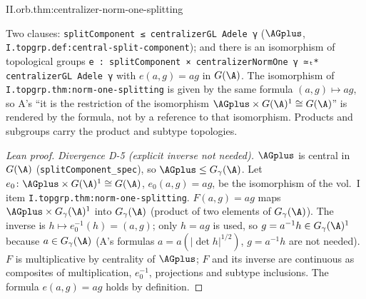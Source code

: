 \begin{theorem}
\end{theorem}
\begin{tfformal}{II.orb.thm:centralizer-norm-one-splitting}
\begin{tffidelity}
Two clauses: \texttt{splitComponent ≤ centralizerGL Adele γ} ($\AGplus$, \texttt{I.topgrp.def:central-split-component}); and there is an isomorphism of topological groups \texttt{e : splitComponent × centralizerNormOne γ ≃ₜ* centralizerGL Adele γ} with $e(a,g)=ag$ in $G(\A)$. The isomorphism of \texttt{I.topgrp.thm:norm-one-splitting} is given by the same formula $(a,g)\mapsto ag$, so A's ``it is the restriction of the isomorphism $\AGplus\times G(\A)^1\cong G(\A)$'' is rendered by the formula, not by a reference to that isomorphism. Products and subgroups carry the product and subtype topologies.
\end{tffidelity}
\end{tfformal}
\begin{proof}[Lean proof]
\emph{Divergence D-5 (explicit inverse not needed).} $\AGplus$ is central in $G(\A)$ (\texttt{splitComponent\_spec}), so $\AGplus\le G_\gamma(\A)$. Let $e_0\colon\AGplus\times G(\A)^1\cong G(\A)$, $e_0(a,g)=ag$, be the isomorphism of the vol.~I item \texttt{I.topgrp.thm:norm-one-splitting}. $F(a,g)=ag$ maps $\AGplus\times G_\gamma(\A)^1$ into $G_\gamma(\A)$ (product of two elements of $G_\gamma(\A)$). The inverse is $h\mapsto e_0^{-1}(h)=(a,g)$; only $h=ag$ is used, so $g=a^{-1}h\in G_\gamma(\A)^1$ because $a\in G_\gamma(\A)$ (A's formulas $a=a(|\det h|^{1/2})$, $g=a^{-1}h$ are not needed). $F$ is multiplicative by centrality of $\AGplus$; $F$ and its inverse are continuous as composites of multiplication, $e_0^{-1}$, projections and subtype inclusions. The formula $e(a,g)=ag$ holds by definition.
\end{proof}

